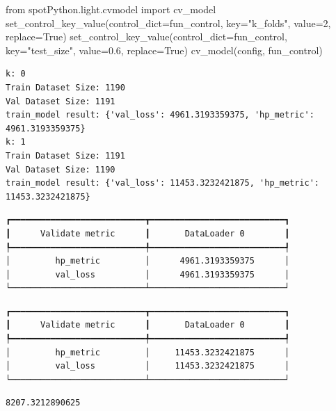 \documentclass[
  letterpaper,
  DIV=11,
  numbers=noendperiod]{scrreprt}
\newenvironment{Shaded}{\begin{snugshade}}{\end{snugshade}}
\newcommand{\DecValTok}[1]{\textcolor[rgb]{0.68,0.00,0.00}{#1}}
\newcommand{\FloatTok}[1]{\textcolor[rgb]{0.68,0.00,0.00}{#1}}
\newcommand{\ImportTok}[1]{\textcolor[rgb]{0.00,0.46,0.62}{#1}}
\newcommand{\NormalTok}[1]{\textcolor[rgb]{0.00,0.23,0.31}{#1}}
\newcommand{\OperatorTok}[1]{\textcolor[rgb]{0.37,0.37,0.37}{#1}}
\newcommand{\StringTok}[1]{\textcolor[rgb]{0.13,0.47,0.30}{#1}}
\newcommand{\VariableTok}[1]{\textcolor[rgb]{0.07,0.07,0.07}{#1}}
\begin{document}
\begin{Shaded}
\begin{Highlighting}[]
\ImportTok{from}\NormalTok{ spotPython.light.cvmodel }\ImportTok{import}\NormalTok{ cv\_model}
\NormalTok{set\_control\_key\_value(control\_dict}\OperatorTok{=}\NormalTok{fun\_control,}
\NormalTok{                        key}\OperatorTok{=}\StringTok{"k\_folds"}\NormalTok{,}
\NormalTok{                        value}\OperatorTok{=}\DecValTok{2}\NormalTok{,}
\NormalTok{                        replace}\OperatorTok{=}\VariableTok{True}\NormalTok{)}
\NormalTok{set\_control\_key\_value(control\_dict}\OperatorTok{=}\NormalTok{fun\_control,}
\NormalTok{                        key}\OperatorTok{=}\StringTok{"test\_size"}\NormalTok{,}
\NormalTok{                        value}\OperatorTok{=}\FloatTok{0.6}\NormalTok{,}
\NormalTok{                        replace}\OperatorTok{=}\VariableTok{True}\NormalTok{)}
\NormalTok{cv\_model(config, fun\_control)}
\end{Highlighting}
\end{Shaded}

\begin{verbatim}
k: 0
Train Dataset Size: 1190
Val Dataset Size: 1191
train_model result: {'val_loss': 4961.3193359375, 'hp_metric': 4961.3193359375}
k: 1
Train Dataset Size: 1191
Val Dataset Size: 1190
train_model result: {'val_loss': 11453.3232421875, 'hp_metric': 11453.3232421875}
\end{verbatim}

\begin{verbatim}
┏━━━━━━━━━━━━━━━━━━━━━━━━━━━┳━━━━━━━━━━━━━━━━━━━━━━━━━━━┓
┃      Validate metric      ┃       DataLoader 0        ┃
┡━━━━━━━━━━━━━━━━━━━━━━━━━━━╇━━━━━━━━━━━━━━━━━━━━━━━━━━━┩
│         hp_metric         │      4961.3193359375      │
│         val_loss          │      4961.3193359375      │
└───────────────────────────┴───────────────────────────┘
\end{verbatim}

\begin{verbatim}
┏━━━━━━━━━━━━━━━━━━━━━━━━━━━┳━━━━━━━━━━━━━━━━━━━━━━━━━━━┓
┃      Validate metric      ┃       DataLoader 0        ┃
┡━━━━━━━━━━━━━━━━━━━━━━━━━━━╇━━━━━━━━━━━━━━━━━━━━━━━━━━━┩
│         hp_metric         │     11453.3232421875      │
│         val_loss          │     11453.3232421875      │
└───────────────────────────┴───────────────────────────┘
\end{verbatim}

\begin{verbatim}
8207.3212890625
\end{verbatim}
\end{document}

